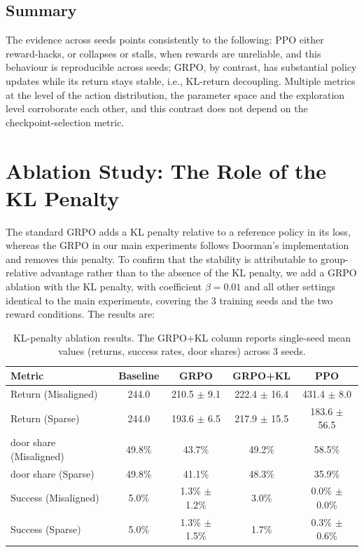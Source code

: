 \subsection{Summary}

The evidence across seeds points consistently to the following: PPO either reward-hacks, or collapses or stalls, when rewards are unreliable, and this behaviour is reproducible across seeds; GRPO, by contrast, has substantial policy updates while its return stays stable, i.e., KL-return decoupling. Multiple metrics at the level of the action distribution, the parameter space and the exploration level corroborate each other, and this contrast does not depend on the checkpoint-selection metric.

\section{Ablation Study: The Role of the KL Penalty}

The standard GRPO adds a KL penalty relative to a reference policy in its loss, whereas the GRPO in our main experiments follows Doorman's implementation and removes this penalty. To confirm that the stability is attributable to group-relative advantage rather than to the absence of the KL penalty, we add a GRPO ablation with the KL penalty, with coefficient $\beta=0.01$ and all other settings identical to the main experiments, covering the 3 training seeds and the two reward conditions. The results are:

\begin{table}[h]
\centering
\begin{tabular}{lcccc}
\hline
Metric & Baseline & GRPO & GRPO+KL & PPO \\
\hline
Return (Misaligned) & 244.0 & 210.5 $\pm$ 9.1 & 222.4 $\pm$ 16.4 & 431.4 $\pm$ 8.0 \\
Return (Sparse) & 244.0 & 193.6 $\pm$ 6.5 & 217.9 $\pm$ 15.5 & 183.6 $\pm$ 56.5 \\
door share (Misaligned) & 49.8\% & 43.7\% & 49.2\% & 58.5\% \\
door share (Sparse) & 49.8\% & 41.1\% & 48.3\% & 35.9\% \\
Success (Misaligned) & 5.0\% & 1.3\% $\pm$ 1.2\% & 3.0\% & 0.0\% $\pm$ 0.0\% \\
Success (Sparse) & 5.0\% & 1.3\% $\pm$ 1.5\% & 1.7\% & 0.3\% $\pm$ 0.6\% \\
\hline
\end{tabular}
\caption{KL-penalty ablation results. The GRPO+KL column reports single-seed mean values (returns, success rates, door shares) across 3 seeds.}
\label{tab:klablation}
\end{table}

